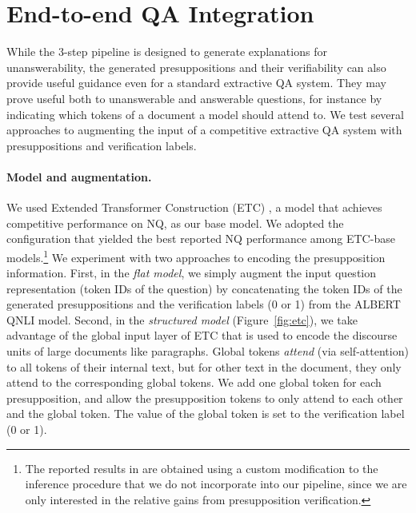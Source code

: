 \documentclass[11pt,a4paper]{article}
\begin{document}
\section{End-to-end QA Integration}
\label{sec:e2e}

While the 3-step pipeline is designed to generate explanations for unanswerability, the generated presuppositions and their verifiability can also provide useful guidance even for a standard extractive QA system. They may prove useful both to unanswerable and answerable questions, for instance by indicating which tokens of a document a model should attend to. We test several approaches to augmenting the input of a competitive extractive QA system with presuppositions and verification labels.

\paragraph{Model and augmentation.} We used Extended Transformer Construction (ETC) \citep{ainslie2020etc}, a model that achieves competitive performance on NQ, as our base model. We adopted the configuration that yielded the best reported NQ performance among ETC-base models.\footnote{The reported results in \citet{ainslie2020etc} are obtained using a custom modification to the inference procedure that we do not incorporate into our pipeline, since we are only interested in the relative gains from presupposition verification.} We experiment with two approaches to encoding the presupposition information. First, in the \emph{flat model}, we simply augment the input question representation (token IDs of the question) by concatenating the token IDs of the generated presuppositions and the verification labels (0 or 1) from the ALBERT QNLI model. Second, in the \emph{structured model} (Figure~\ref{fig:etc}), we take advantage of the global input layer of ETC that is used to encode the discourse units of large documents like paragraphs. Global tokens \emph{attend} (via self-attention) to all tokens of their internal text, but for other text in the document, they only attend to the corresponding global tokens. We add one global token for each presupposition, and allow the presupposition tokens to only attend to each other and the global token. The value of the global token is set to the verification label (0 or 1).
\end{document}

